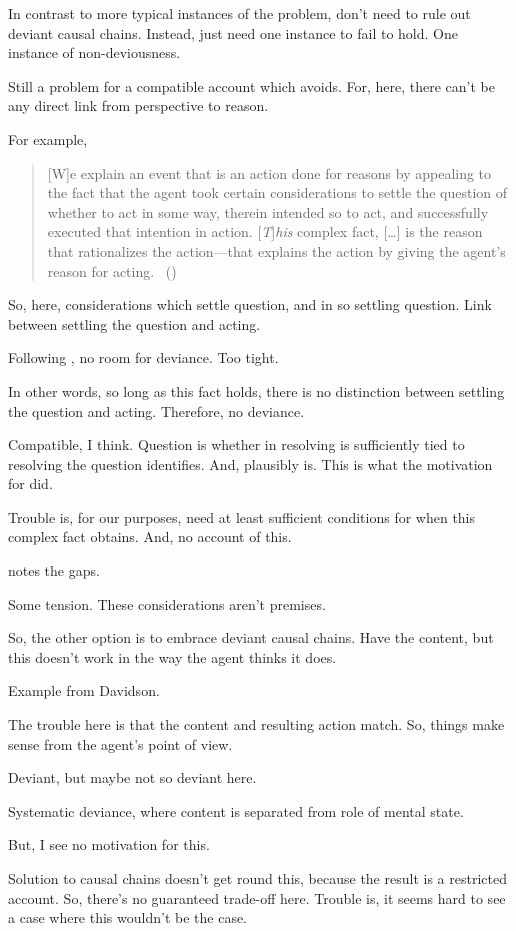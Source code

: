 \begin{note}
  In contrast to more typical instances of the problem, don't need to rule out deviant causal chains.
  Instead, just need one instance to fail to hold.
  One instance of non-deviousness.

  Still a problem for a compatible account which avoids.
  For, here, there can't be any direct link from perspective to reason.

  For example, \citeauthor{Hieronymi:2011aa}

    \begin{quote}
      [W]e explain an event that is an action done for reasons by appealing to the fact that the agent took certain considerations to settle the question of whether to act in some way, therein intended so to act, and successfully executed that intention in action.
    [\emph{T}]\emph{his} complex fact, [\dots] is the reason that rationalizes the action---that explains the action by giving the agent’s reason for acting.%
    \mbox{ }\hfill\mbox{(\citeyear[431]{Hieronymi:2011aa})}
  \end{quote}

  So, here, considerations which settle question, and in so settling question.
  Link between settling the question and acting.

  Following \citeauthor{Hieronymi:2011aa}, no room for deviance.
  Too tight.

  In other words, so long as this fact holds, there is no distinction between settling the question and acting.
  Therefore, no deviance.

  Compatible, I think.
  Question is whether in resolving \qzS{} is sufficiently tied to resolving the question \citeauthor{Hieronymi:2011aa} identifies.
  And, plausibly is.
  This is what the motivation for \qzS{} did.

  Trouble is, for our purposes, need at least sufficient conditions for when this complex fact obtains.
  And, no account of this.

  \citeauthor{Hieronymi:2011aa} notes the gaps.

  Some tension.
  These considerations aren't premises.
\end{note}

\begin{note}
  So, the other option is to embrace deviant causal chains.
  Have the content, but this doesn't work in the way the agent thinks it does.

  Example from Davidson.

  The trouble here is that the content and resulting action match.
  So, things make sense from the agent's point of view.

  Deviant, but maybe not so deviant here.

  Systematic deviance, where content is separated from role of mental state.

  But, I see no motivation for this.

  Solution to causal chains doesn't get round this, because the result is a restricted account.
  So, there's no guaranteed trade-off here.
  Trouble is, it seems hard to see a case where this wouldn't be the case.
\end{note}

